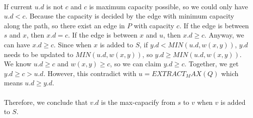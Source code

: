 \documentclass{article}
\begin{document}
\paragraph{}
If current $u.d$ is not $c$ and $c$ is maximum capacity possible, so we could only have $u.d < c$. Because the capacity is decided by the edge with minimum capacity along the path, so there exist an edge in $P$ with capacity $c$. If the edge is between $s$ and $x$, then $x.d = c$. If the edge is between $x$ and $u$, then $x.d \ge c$. Anyway, we can have $x.d \ge c$. Since when $x$ is added to $S$, if $y.d < MIN(u.d, w(x, y))$, $y.d$ needs to be updated to $MIN(u.d, w(x, y))$, so $y.d \ge MIN(u.d, w(x, y))$. We know $u.d \ge c$ and $w(x, y) \ge c$, so we can claim $y.d \ge c$.
Together, we get $y.d \ge c > u.d$. However, this contradict with $u = EXTRACT_MAX(Q)$ which means $u.d \ge y.d$.

\paragraph{}
Therefore, we conclude that $v.d$ is the max-capacify from $s$ to $v$ when $v$ is added to $S$.
\end{document}
